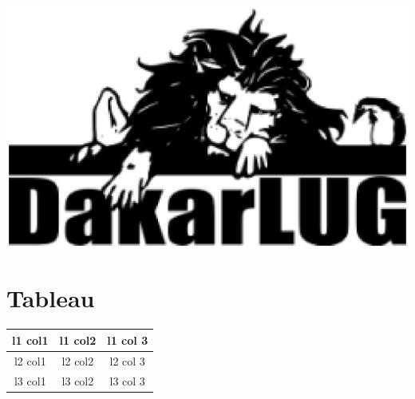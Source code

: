 \documentclass[a4paper,12pt]{book}
\begin{document}
		\includegraphics{dakarlug} \\
		
		
		
	\part{Tableau}
	
	\begin{tabular}{|c | c | c |}
		\hline
		l1 col1 & l1 col2 & l1 col 3 \\
		\hline
		l2 col1 & l2 col2 & l2 col 3 \\
		\hline
		l3 col1 & l3 col2 & l3 col 3 \\
		\hline
	\end{tabular}
	
\end{document}

